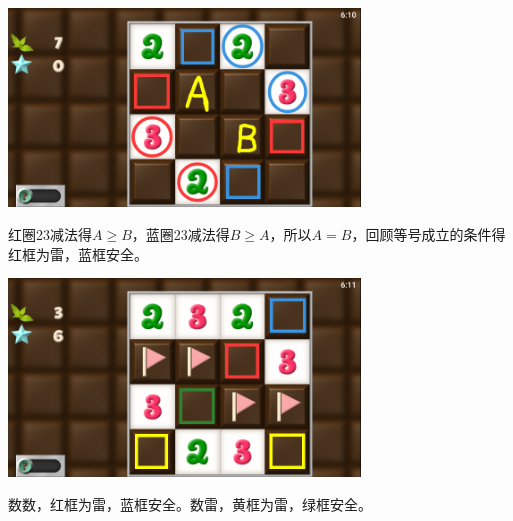 \subsection{} %
\begin{center}
    \includegraphics[width=0.7\textwidth]{puzzle/103-1.png}
\end{center}
红圈23减法得$A\ge B$，蓝圈23减法得$B\ge A$，所以$A=B$，回顾等号成立的条件得红框为雷，蓝框安全。
\begin{center}
    \includegraphics[width=0.7\textwidth]{puzzle/103-2.png}
\end{center}
数数，红框为雷，蓝框安全。数雷，黄框为雷，绿框安全。

